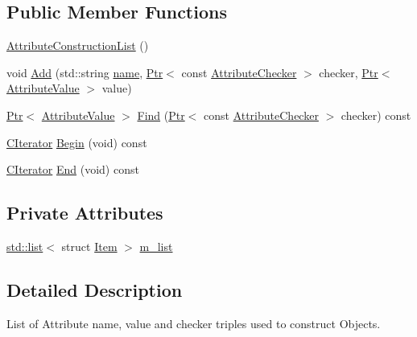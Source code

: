 \subsection*{Public Member Functions}
\begin{DoxyCompactItemize}
\item 
\hyperlink{classns3_1_1AttributeConstructionList_ac07595eac9d98c00f3df0e2badb0d83b}{Attribute\+Construction\+List} ()
\item 
void \hyperlink{classns3_1_1AttributeConstructionList_a6f418bf1a2de8828ae99278c9d3facdd}{Add} (std\+::string \hyperlink{generate__test__data__lte__spectrum__model_8m_ab74e6bf80237ddc4109968cedc58c151}{name}, \hyperlink{classns3_1_1Ptr}{Ptr}$<$ const \hyperlink{classns3_1_1AttributeChecker}{Attribute\+Checker} $>$ checker, \hyperlink{classns3_1_1Ptr}{Ptr}$<$ \hyperlink{classns3_1_1AttributeValue}{Attribute\+Value} $>$ value)
\item 
\hyperlink{classns3_1_1Ptr}{Ptr}$<$ \hyperlink{classns3_1_1AttributeValue}{Attribute\+Value} $>$ \hyperlink{classns3_1_1AttributeConstructionList_a22de5cf3e1bcd9dc6c7748fc911811b4}{Find} (\hyperlink{classns3_1_1Ptr}{Ptr}$<$ const \hyperlink{classns3_1_1AttributeChecker}{Attribute\+Checker} $>$ checker) const 
\item 
\hyperlink{classns3_1_1AttributeConstructionList_aa1a046c928d9d1870a5f8ab8cb6cf6e9}{C\+Iterator} \hyperlink{classns3_1_1AttributeConstructionList_af1b4b0acdf6828725e6ee98a8a05de60}{Begin} (void) const 
\item 
\hyperlink{classns3_1_1AttributeConstructionList_aa1a046c928d9d1870a5f8ab8cb6cf6e9}{C\+Iterator} \hyperlink{classns3_1_1AttributeConstructionList_abccb49f4ce63b354f0feae0386a2cad0}{End} (void) const 
\end{DoxyCompactItemize}
\subsection*{Private Attributes}
\begin{DoxyCompactItemize}
\item 
\hyperlink{openflow-interface_8h_afd9bcfa176617760671b67580f536fa7}{std\+::list}$<$ struct \hyperlink{structns3_1_1AttributeConstructionList_1_1Item}{Item} $>$ \hyperlink{classns3_1_1AttributeConstructionList_a4c2f4c79b28283ce91431462b9b5a716}{m\+\_\+list}
\end{DoxyCompactItemize}


\subsection{Detailed Description}
List of Attribute name, value and checker triples used to construct Objects. 


